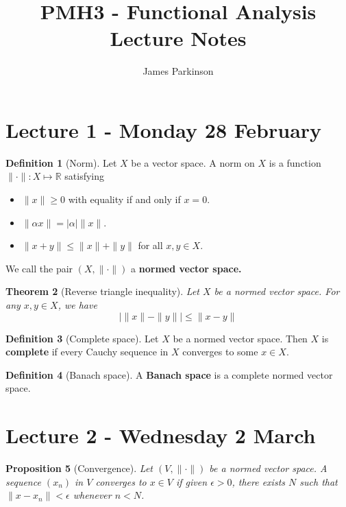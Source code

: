 \documentclass[10pt, reqno, oneside]{amsart}
\title{PMH3 - Functional Analysis \\ Lecture Notes}								%
\author{James Parkinson}
\theoremstyle{plain}%
\newtheorem{thm}{Theorem}[section]
\newtheorem{prop}[thm]{Proposition}
\theoremstyle{definition}
\newtheorem{defn}[thm]{Definition}
\theoremstyle{remark}
\newcommand{\R}{\mathbb{R}}
\begin{document}
\maketitle

\section{Lecture 1 - Monday 28 February} %
\label{sec:lecture_1_28_february}

\begin{defn}[Norm]
	Let $X$ be a vector space.  A norm on $X$ is a function $\| \cdot \| : X \mapsto \R$ satisfying 
	\begin{itemize}
		\item $\| x \| \geq 0$ with equality if and only if $x = 0$.  
		\item $\| \alpha x \| = | \alpha | \| x \|$.
		\item $\| x + y \| \leq \| x \| + \| y \|$ for all $x, y \in X$.  
	\end{itemize}
	
	We call the pair $(X, \| \cdot \|)$ a \textbf{normed vector space.}
\end{defn}

\begin{thm}[Reverse triangle inequality]
	Let $X$ be a normed vector space.  For any $x, y \in X$, we have \[
		\left| \|x \| - \| y \| \right| \leq \| x - y \|  
	\]
\end{thm}

\begin{defn}[Complete space]
	Let $X$ be a normed vector space.  Then $X$ is \textbf{complete} if every Cauchy sequence in $X$ converges to some $x \in X$.  
\end{defn}

\begin{defn}[Banach space]
	A \textbf{Banach space} is a complete normed vector space.
\end{defn}



\section{Lecture 2 - Wednesday 2 March} %
\label{sec:lecture_2_2_march}

\begin{prop}[Convergence] Let $(V, \| \cdot \| )$ be a normed vector space.  A sequence $(x_n)$ in $V$ converges to $x \in V$ if given $\epsilon > 0$, there exists $N$ such that $\| x - x_n \| < \epsilon$ whenever $n < N$. 
\end{prop}
\end{document}

